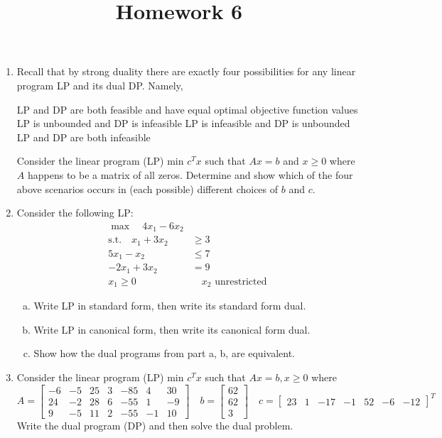 \documentclass{article}
\begin{document}
\title{Homework 6}
\maketitle
\thispagestyle{fancy}

\begin{enumerate}
	\item Recall that by strong duality there are exactly four possibilities for any linear program LP and its dual DP. Namely,
		\begin{enumerate}[i)]
				\ii LP and DP are both feasible and have equal optimal objective function values
				\ii LP is unbounded and DP is infeasible
				\ii LP is infeasible and DP is unbounded
				\ii LP and DP are both infeasible
		\end{enumerate}

		Consider the linear program (LP) min $c^T x$ such that $Ax=b$ and $x\ge 0$ where $A$ happens to be a matrix of all zeros. Determine and show which of the four above scenarios occurs in (each possible) different choices of $b$ and $c.$

	\item Consider the following LP:
		\begin{align*}
			\max \quad 4x_1-6x_2 & \\
			\text{s.t.}\quad x_1+3x_2 &\ge 3 \\
			5x_1-x_2 &\le 7 \\
			-2x_1+3x_2 &= 9 \\
			x_1\ge 0 &\quad x_2\text{ unrestricted}
		\end{align*}

		\begin{enumerate}[a)]
			\item Write LP in standard form, then write its standard form dual.

			\item Write LP in canonical form, then write its canonical form dual.

			\item Show how the dual programs from part a, b, are equivalent.

		\end{enumerate}

	\item Consider the linear program (LP) min $c^T x$ such that $Ax=b, x\ge 0$ where \[A=\begin{bmatrix}
				-6 & -5 & 25 & 3 & -85 & 4 & 30 \\
				24 & -2 & 28 & 6 & -55 & 1 & -9 \\
				9 & -5 & 11 & 2 & -55 & -1 & 10
			\end{bmatrix}\quad b=\begin{bmatrix}
				62 \\ 62 \\ 3
			\end{bmatrix}\quad c=\begin{bmatrix}
				23 & 1 & -17 & -1 & 52 & -6 & -12
		\end{bmatrix}^T\]
		Write the dual program (DP) and then solve the dual problem.


\end{enumerate}
\end{document}
